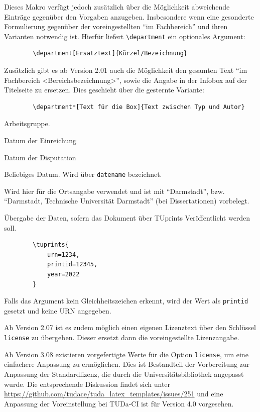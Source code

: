 \documentclass[
	ngerman,
	ruledheaders=chapter,%
	class=book,%
	thesis={
		type=dr,
		dr=rernat
	},
	accentcolor=9c,%
	custommargins=true,%
	marginpar=false,%
	fontsize=11pt,%
]{tudapub}
\let\code\texttt
\begin{document}
\begin{description}
	Dieses Makro verfügt jedoch zusätzlich über die Möglichkeit abweichende Einträge gegenüber den Vorgaben anzugeben. Insbesondere wenn eine gesonderte Formulierung gegenüber der voreingestellten \enquote{im Fachbereich} und ihren Varianten notwendig ist. Hierfür liefert \code{\textbackslash{}department} ein optionales Argument:

	\begin{verbatim}
		\department[Ersatztext]{Kürzel/Bezeichnung}
	\end{verbatim}
	Zusätzlich gibt es ab Version 2.01 auch die Möglichkeit den gesamten Text \enquote{im Fachbereich <Bereichsbezeichnung>}, sowie die Angabe in der Infobox auf der Titelseite zu ersetzen. Dies geschieht über die gesternte Variante:
	\begin{verbatim}
		\department*[Text für die Box]{Text zwischen Typ und Autor}
	\end{verbatim}
	\item[group] Arbeitsgruppe.
	\item[submissiondate] Datum der Einreichung
	\item[examdate] Datum der Disputation
	\item[date] Beliebiges Datum. Wird über \verb|datename| bezeichnet.
	\item[publishers] Wird hier für die Ortsangabe verwendet und ist mit \enquote{Darmstadt}, bzw. \enquote{Darmstadt, Technische Universität Darmstadt} (bei Dissertationen) vorbelegt.
	\item[tuprints] \label{page:tuprints}Übergabe der Daten, sofern das Dokument über TUprints Veröffentlicht werden soll.
	\begin{verbatim}
		\tuprints{
			urn=1234,
			printid=12345,
			year=2022
		}
	\end{verbatim}
	Falls das Argument kein Gleichheitszeichen erkennt, wird der Wert als \code{printid} gesetzt und keine URN angegeben.

	Ab Version 2.07 ist es zudem möglich einen eigenen Lizenztext über den Schlüssel \verb|license| zu übergeben. Dieser ersetzt dann die voreingestellte Lizenzangabe.

	Ab Version 3.08 existieren vorgefertigte Werte für die Option \verb|license|, um eine einfachere Anpassung zu ermöglichen.
	Dies ist Bestandteil der Vorbereitung zur Anpassung der Standardlizenz, die durch die Universitätsbibliothek angepasst wurde.
	Die entsprechende Diskussion findet sich unter \url{https://github.com/tudace/tuda_latex_templates/issues/251} und eine Anpassung der Voreinstellung bei TUDa-CI ist für Version 4.0 vorgesehen.


\end{description}
\end{document}
